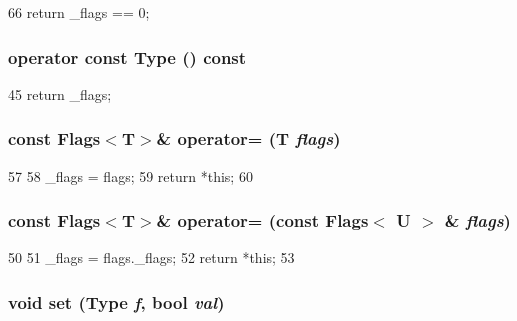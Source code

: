 \begin{DoxyCode}
66 { return _flags == 0; }
\end{DoxyCode}
\hypertarget{classFlags_a14bc478d07abb05059cab5049412ea5e}{
\subsubsection[{operator const Type}]{\setlength{\rightskip}{0pt plus 5cm}operator const {\bf Type} () const}}
\label{classFlags_a14bc478d07abb05059cab5049412ea5e}



\begin{DoxyCode}
45 { return _flags; }
\end{DoxyCode}
\hypertarget{classFlags_a0367a36b9df81fe58a45bc9dc0f9f86e}{
\subsubsection[{operator=}]{\setlength{\rightskip}{0pt plus 5cm}const {\bf Flags}$<$T$>$\& operator= (T {\em flags})}}
\label{classFlags_a0367a36b9df81fe58a45bc9dc0f9f86e}



\begin{DoxyCode}
57     {
58         _flags = flags;
59         return *this;
60     }
\end{DoxyCode}
\hypertarget{classFlags_a7b7a5f51d8423793f918f5a9471e4528}{
\subsubsection[{operator=}]{\setlength{\rightskip}{0pt plus 5cm}const {\bf Flags}$<$T$>$\& operator= (const {\bf Flags}$<$ U $>$ \& {\em flags})}}
\label{classFlags_a7b7a5f51d8423793f918f5a9471e4528}



\begin{DoxyCode}
50     {
51         _flags = flags._flags;
52         return *this;
53     }
\end{DoxyCode}
\hypertarget{classFlags_aa0d392c090761994a8f5221fa2871d26}{
\subsubsection[{set}]{\setlength{\rightskip}{0pt plus 5cm}void set ({\bf Type} {\em f}, \/  bool {\em val})}}
\label{classFlags_aa0d392c090761994a8f5221fa2871d26}



